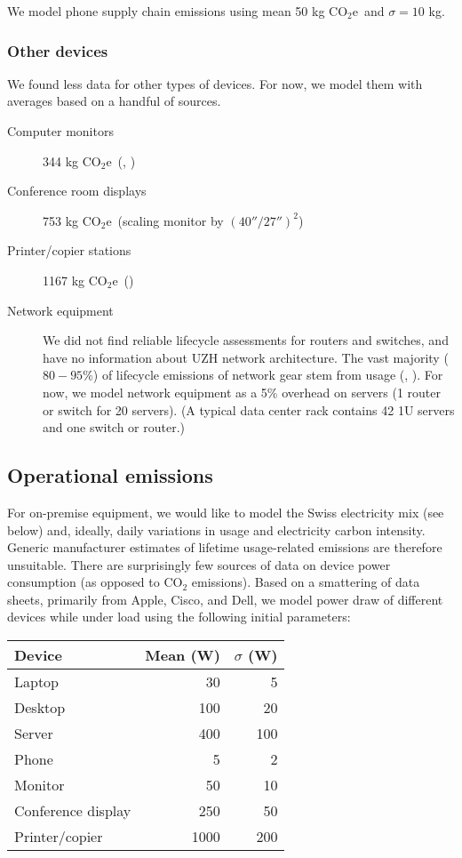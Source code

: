 \documentclass[11pt]{article}
\newcommand{\assumption}[1]{{#1}}
\newcommand{\coe}{CO$_2$e}
\newcommand{\gcoe}{g \coe}
\newcommand{\kgcoe}{k\gcoe}
\begin{document}
\assumption{We model phone supply chain emissions using mean 50 \kgcoe\ and $\sigma = 10$ kg.}

\subsubsection{Other devices}

We found less data for other types of devices. For now, we model them with averages based
on a handful of sources.

\begin{description}
    \item[Computer monitors] 344 \kgcoe\ (\textcite{teehan2013}, \textcite{dellpcf})
    \item[Conference room displays] 753 \kgcoe\ (scaling monitor by $(40''/27'')^2$)
    \item[Printer/copier stations] 1167 \kgcoe\ (\textcite{ecoinvent})
    \item[Network equipment] We did not find reliable lifecycle assessments for routers and switches,
      and have no information about UZH network architecture. The vast majority ($80-95\%$) of
      lifecycle emissions of network gear stem from usage (\textcite{cisco2024}, \textcite{jacob2023}).
      For now, we model network equipment as a 5\% overhead on servers (1 router or switch for 20 servers).
      (A typical data center rack contains 42 1U servers and one switch or router.)
\end{description}

\subsection{Operational emissions}

For on-premise equipment, we would like to model the Swiss electricity mix (see below) and, ideally,
daily variations in usage and electricity carbon intensity.
Generic manufacturer estimates of lifetime usage-related emissions are therefore unsuitable.
There are surprisingly few sources of data on device power consumption (as opposed to CO$_2$ emissions).
Based on a smattering of data sheets, primarily from Apple, Cisco, and Dell, we model
power draw of different devices while under load using the following initial parameters:

\begin{center}
\begin{tabular}{|l|r|r|}
\hline
\textbf{Device} & \textbf{Mean (W)} & \textbf{$\sigma$ (W)} \\ \hline
Laptop & 30 & 5 \\ \hline
Desktop & 100 & 20 \\ \hline
Server & 400 & 100 \\ \hline
Phone & 5 & 2 \\ \hline
Monitor & 50 & 10 \\ \hline
Conference display & 250 & 50 \\ \hline
Printer/copier & 1000 & 200 \\ \hline
\end{tabular}
\end{center}
\end{document}
